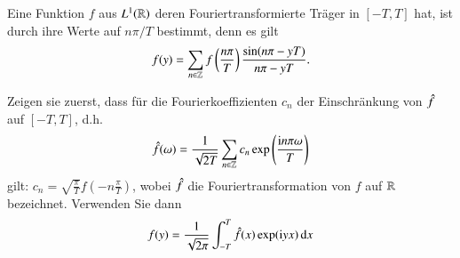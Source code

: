 
\begin{exercise}
  Eine Funktion $f$ aus $L^1(\mathbb{R})$ deren Fourier\-trans\-form\-ierte Träger in $[-T,T]$ hat, ist durch ihre Werte auf $n \pi / T$ bestimmt, denn es gilt
  \begin{equation*}
    f(y)=\sum_{n \in \mathbb{Z}}{f\left(\frac{n \pi}{T}\right)\frac{\sin(n\pi - yT)}{n\pi - yT}}.
  \end{equation*}

  Zeigen sie zuerst, dass für die Fourierkoeffizienten $c_n$ der Einschränkung von $\hat{f}$ auf $[{-T},T]$, d.h.
  \begin{equation*}
    \hat{f}(\omega)=\frac{1}{\sqrt{2T}}\sum_{n \in \mathbb{Z}}{c_n \exp \left( \frac{\mathrm{i} n \pi \omega}{T} \right)}
  \end{equation*}
  gilt: $c_n=\sqrt{\frac{\pi}{T}}f\left(-n\frac{\pi}{T}\right)$, wobei $\hat{f}$ die Fouriertransformation von $f$ auf $\mathbb{R}$ bezeichnet. Verwenden Sie dann
  \begin{equation*}
    f(y)=\frac{1}{\sqrt{2\pi}}\int_{-T}^T{\fouriertransform{f}(x)\exp(\i yx) \dif x}
  \end{equation*}
\end{exercise}

